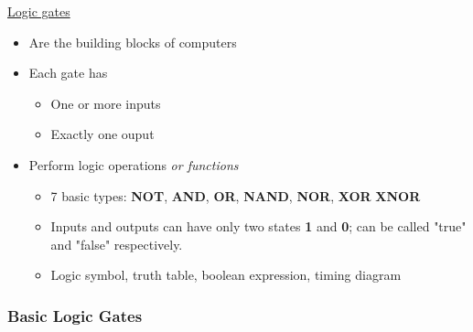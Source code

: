 \documentclass{article}
\begin{document}
\underline{Logic gates}
\begin{itemize}
\item Are the building blocks of computers
\item Each gate has
\begin{itemize}
\item One or more inputs
\item Exactly one ouput
\end{itemize}
\item Perform logic operations \textit{or functions}
\begin{itemize}
\item 7 basic types: \textbf{NOT}, \textbf{AND}, \textbf{OR}, \textbf{NAND}, \textbf{NOR}, \textbf{XOR}
\textbf{XNOR}
\item Inputs and outputs can have only two states \textbf{1} and \textbf{0}; can be called "true" and "false"
respectively.
\item Logic symbol, truth table, boolean expression, timing diagram
\end{itemize}
\end{itemize}

\subsubsection{Basic Logic Gates}
\end{document}
